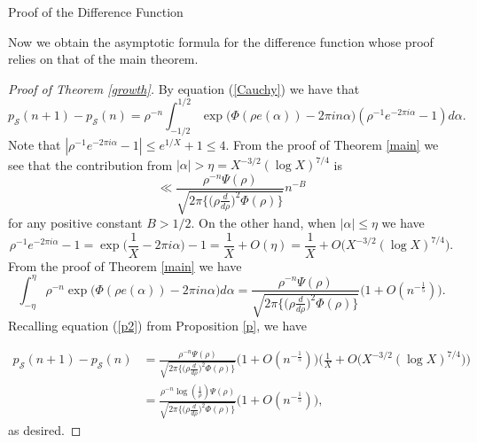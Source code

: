 \documentclass[12pt,reqno]{amsart}
\makeatletter
\def\section{\@startsection{section}{1}
  \z@{.7\linespacing\@plus\linespacing}{.5\linespacing}
  {\normalfont\scshape\bfseries}}
\makeatother
\begin{document}
\section{Proof of the Difference Function}\label{diff}


 Now we obtain the asymptotic formula for the difference function whose proof relies on that of the main theorem.

\begin{proof}[Proof of Theorem \ref{growth}]
    By equation (\ref{Cauchy}) we have that
    \begin{equation*}
        p_\mathcal{S}(n+1)-p_\mathcal{S}(n)= \rho^{-n} \int_{-1/2}^{1/2} \exp\big(\Phi(\rho e(\alpha))-2\pi in\alpha\big) (\rho^{-1}e^{-2\pi i\alpha}-1) d\alpha.
    \end{equation*}
    Note that $|\rho^{-1}e^{-2\pi i\alpha}-1|\leq e^{1/X}+1\leq 4$. From the proof of Theorem \ref{main} we see that the contribution from $|\alpha|>\eta=X^{-3/2}(\log X)^{7/4}$ is
    \begin{equation*}
        \ll \frac{\rho^{-n}\Psi(\rho)}{\sqrt{2\pi \Big\{\Big(\rho\frac{d}{d\rho}\Big)^2 \Phi(\rho)\Big\}}}n^{-B}
    \end{equation*}
    for any positive constant $B>1/2$. On the other hand, when $|\alpha|\leq \eta$ we have 
    \begin{equation*}
        \rho^{-1}e^{-2\pi i\alpha}-1=\exp\Big(\frac{1}{X}-2\pi i\alpha\Big)-1=\frac{1}{X}+O(\eta)=\frac{1}{X}+O\big(X^{-3/2}(\log X)^{7/4}\big).
    \end{equation*}
    From the proof of Theorem \ref{main} we have
    \begin{equation*}
        \int_{-\eta}^\eta \rho^{-n} \exp\big(\Phi(\rho e(\alpha))-2\pi in\alpha\big) d\alpha =\frac{\rho^{-n}\Psi(\rho)}{\sqrt{2 \pi  \Big\{\Big(\rho\frac{d}{d\rho}\Big)^2 \Phi(\rho)\Big\}}}\Big(1+O(n^{-\frac{1}{5}})\Big).
    \end{equation*}
    Recalling equation (\ref{p2}) from Proposition \ref{p}, we have
    
    \begin{align*}
        p_\mathcal{S}(n+1)-p_\mathcal{S}(n) &=\frac{\rho^{-n}\Psi(\rho)}{\sqrt{2 \pi  \Big\{\Big(\rho\frac{d}{d\rho}\Big)^2 \Phi(\rho)\Big\}}}\Big(1+O(n^{-\frac{1}{5}})\Big)\Big(\frac{1}{X}+O\big(X^{-3/2}(\log X)^{7/4}\big)\Big)\\
        &=\frac{\rho^{-n}\log(\frac{1}{\rho})\Psi(\rho)}{\sqrt{2 \pi \Big\{\Big(\rho\frac{d}{d\rho}\Big)^2 \Phi(\rho)\Big\}}}\Big(1+O(n^{-\frac{1}{5}})\Big),
    \end{align*}
    as desired.
\end{proof}
\end{document}
